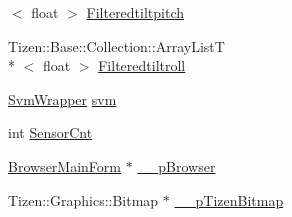 \begin{DoxyCompactItemize}
$<$ float $>$ \hyperlink{class_calculator_form_a54065fa7531b14c744c8d11ccd849f81}{Filteredtiltpitch}
\item 
Tizen\+::\+Base\+::\+Collection\+::\+Array\+List\+T\\*
$<$ float $>$ \hyperlink{class_calculator_form_a63438d1ef5396e2d216eaf604659c96c}{Filteredtiltroll}
\item 
\hyperlink{class_svm_wrapper}{Svm\+Wrapper} \hyperlink{class_calculator_form_ac3e3da16eada2566553b992a8d254366}{svm}
\item 
int \hyperlink{class_calculator_form_a846432327af7a8d40a4a3b586ee3581a}{Sensor\+Cnt}
\item 
\hyperlink{class_browser_main_form}{Browser\+Main\+Form} $\ast$ \hyperlink{class_calculator_form_afc760fc5946b899bd2b0807157098a3e}{\+\_\+\+\_\+p\+Browser}
\item 
Tizen\+::\+Graphics\+::\+Bitmap $\ast$ \hyperlink{class_calculator_form_a88ec1e4da579824a2f78534d11ffad8b}{\+\_\+\+\_\+p\+Tizen\+Bitmap}
\end{DoxyCompactItemize}

